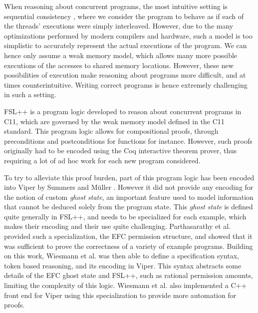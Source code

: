 When reasoning about concurrent programs, the most intuitive setting is sequential consistency \cite{LamportSC}, where we consider the program to behave as if each of the threads' executions were simply interleaved. However, due to the many optimizations performed by modern compilers and hardware, such a model is too simplistic to accurately represent the actual executions of the program. We can hence only assume a weak memory model, which allows many more possible executions of the accesses to shared memory locations. However, these new possibilities of execution make reasoning about programs more difficult, and at times counterintuitive. Writing correct programs is hence extremely challenging in such a setting.

FSL++ \cite{fsl} is a program logic developed to reason about concurrent programs in C11, which are governed by the weak memory model defined in the C11 standard. This program logic allows for compositional proofs, through preconditions and postconditions for functions for instance. However, such proofs originally had to be encoded using the Coq interactive theorem prover, thus requiring a lot of ad hoc work for each new program considered.


To try to alleviate this proof burden, part of this program logic has been encoded into Viper \cite{viper} by Summers and M\"uller \cite{rslViper}. However it did not provide any encoding for the notion of custom \emph{ghost state}, an important feature used to model information that cannot be deduced solely from the program state. This \emph{ghost state} is defined quite generally in FSL++, and needs to be specialized for each example, which makes their encoding and their use quite challenging. Parthasarathy et al. \cite{gaurav} provided such a specialization, the EFC permission structure, and showed that it was sufficient to prove the correctness of a variety of example programs. Building on this work, Wiesmann et al. \cite{pascal} was then able to define a specification syntax, token based reasoning, and its encoding in Viper. This syntax abstracts some details of the EFC ghost state and FSL++, such as rational permission amounts, limiting the complexity of this logic.
Wiesmann et al. \cite{pascal} also implemented a C++ front end for Viper using this specialization to provide more automation for proofs.  

